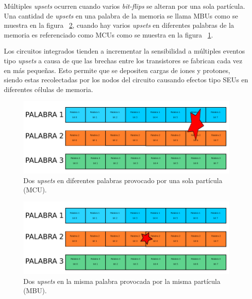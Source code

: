 Múltiples \textit{upsets} ocurren cuando varios \textit{bit-flips} se alteran por una sola partícula. Una cantidad de \textit{upsets} en una palabra de la memoria se llama MBUs como se muestra en la figura ~\ref{MBU}, cuando hay varios \textit{upsets} en diferentes palabras de la memoria es referenciado como MCUs como se muestra en la figura ~\ref{MCU}.

Los circuitos integrados tienden a incrementar la sensibilidad a múltiples eventos tipo \textit{upsets} a causa de que las brechas entre los transistores se fabrican cada vez en más pequeñas. Esto permite que se depositen cargas de iones y protones, siendo estas recolectadas por los nodos del circuito causando efectos tipo SEUs en diferentes células de memoria.

\begin{figure}[H]
	\centering
	\includegraphics[width=0.6 \textwidth]{img/MCU.pdf}
	\caption{Dos \textit{upsets} en diferentes palabras provocado por una sola partícula (MCU).}
	\label{MCU}
\end{figure}

\begin{figure}[H]
	\centering
	\includegraphics[width=0.6 \textwidth]{img/MBU.pdf}
	\caption{Dos \textit{upsets} en la misma palabra provocada por la misma partícula (MBU).}
	\label{MBU}
\end{figure}